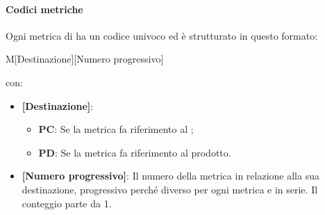 \paragraph{Codici metriche}\mbox{}
Ogni metrica di  ha un codice univoco ed è strutturato in questo formato:
\begin{center}
    M[Destinazione][Numero progressivo]
\end{center}
con:
\begin{itemize}  
    \item \textbf{[Destinazione]}:
    \begin{itemize}
        \item \textbf{PC}: Se la metrica fa riferimento al ;
        \item \textbf{PD}: Se la metrica fa riferimento al prodotto.
    \end{itemize}
    \item \textbf{[Numero progressivo]}: Il numero della metrica in relazione alla sua destinazione, progressivo perché diverso per ogni metrica e in serie. Il conteggio parte da 1.
\end{itemize}


